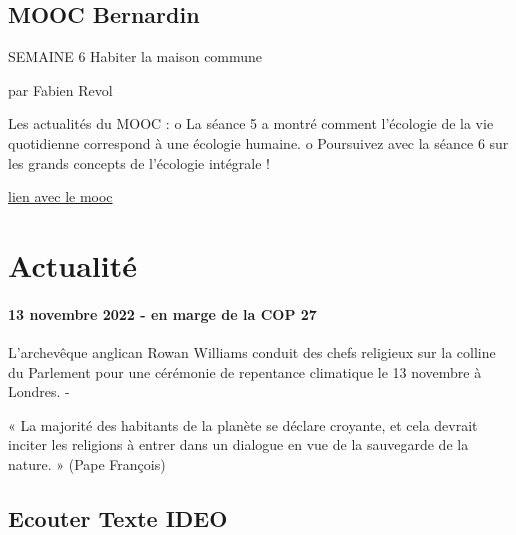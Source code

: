         
\subsection{MOOC Bernardin}

 	SEMAINE 6
Habiter la maison commune
 
par Fabien Revol

	Les actualités du MOOC :
o	La séance 5 a montré comment l'écologie de la vie quotidienne correspond à une écologie humaine.
o	Poursuivez avec la séance 6 sur les grands concepts de l'écologie intégrale !

\href{https://www.lecampusdesbernardins.fr/resource/26/?utm_source=sendinblue&utm_campaign=20221107_NL_MOOC_sans_dons&utm_medium=email}{lien avec le mooc}

\section{Actualité}
\paragraph{13 novembre 2022 - en marge de la COP 27}
L’archevêque anglican Rowan Williams conduit des chefs religieux sur la colline du Parlement pour une cérémonie de repentance climatique le 13 novembre à Londres. -
 
\begin{singlequote}
    « La majorité des habitants de la planète se déclare croyante, et cela devrait inciter les religions à entrer dans un dialogue en vue de la sauvegarde de la nature. » (Pape François)
\end{singlequote}


\subsection{Ecouter Texte IDEO}